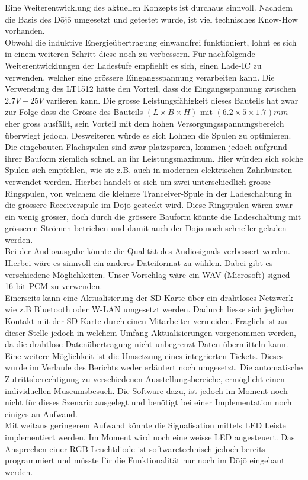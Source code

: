 Eine Weiterentwicklung des aktuellen Konzepts ist durchaus sinnvoll. Nachdem die Basis des Dōjō umgesetzt und getestet wurde, ist viel technisches \glqq Know-How \grqq vorhanden.\\
Obwohl die induktive Energieübertragung einwandfrei funktioniert, lohnt es sich in einem weiteren Schritt diese noch zu verbessern. Für nachfolgende Weiterentwicklungen der Ladestufe empfiehlt es sich, einen Lade-IC zu verwenden, welcher eine grössere Eingangsspannung verarbeiten kann. Die Verwendung des LT1512 hätte den Vorteil, dass die Eingangsspannung zwischen $2.7V - 25V$ variieren kann. Die grosse Leistungsfähigkeit dieses Bauteils hat zwar zur Folge dass die Grösse des Bauteils $(L \times B \times H)$ mit $(6.2\times 5\times 1.7)mm$ eher gross ausfällt, sein Vorteil mit dem hohen Versorgungsspannungsbereich überwiegt jedoch. Desweiteren würde es sich Lohnen die Spulen zu optimieren. Die eingebauten Flachspulen sind zwar platzsparen, kommen jedoch aufgrund ihrer Bauform ziemlich schnell an ihr Leistungsmaximum. Hier würden sich solche Spulen sich empfehlen, wie sie z.B. auch in modernen elektrischen Zahnbürsten verwendet werden. Hierbei handelt es sich um zwei unterschiedlich grosse Ringspulen, von welchem die kleinere Tranceiver-Spule in der Ladeschaltung in die grössere Receiverspule  im Dōjō gesteckt wird. Diese Ringspulen wären zwar ein wenig grösser, doch durch die grössere Bauform könnte die Ladeschaltung mit grösseren Strömen betrieben und damit auch der Dōjō noch schneller geladen werden.\\
Bei der Audioausgabe könnte die Qualität des Audiosignals verbessert werden. Hierbei wäre es sinnvoll ein anderes Dateiformat zu wählen. Dabei gibt es verschiedene Möglichkeiten. Unser Vorschlag wäre ein WAV (Microsoft) signed 16-bit PCM zu verwenden.\\
Einerseits kann eine Aktualisierung der SD-Karte über ein drahtloses Netzwerk wie z.B Bluetooth oder W-LAN umgesetzt werden. Dadurch liesse sich jeglicher Kontakt mit der SD-Karte durch einen Mitarbeiter vermeiden. Fraglich ist an dieser Stelle jedoch in welchem Umfang Aktualisierungen vorgenommen werden, da die drahtlose Datenübertragung nicht unbegrenzt Daten übermitteln kann.\\
Eine weitere Möglichkeit ist die Umsetzung eines integrierten Tickets. Dieses wurde im Verlaufe des Berichts weder erläutert noch umgesetzt. Die automatische Zutrittsberechtigung zu verschiedenen Ausstellungsbereiche, ermöglicht einen individuellen Museumsbesuch. Die Software dazu, ist jedoch im Moment noch nicht für dieses Szenario ausgelegt und benötigt bei einer Implementation noch einiges an Aufwand.\\
Mit weitaus geringerem Aufwand könnte die Signalisation mittels LED Leiste implementiert werden. Im Moment wird noch eine weisse LED angesteuert. Das Ansprechen einer RGB Leuchtdiode ist softwaretechnisch jedoch bereits programmiert und müsste für die Funktionalität nur noch im Dōjō eingebaut werden.